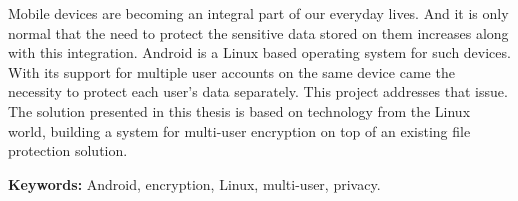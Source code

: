 
Mobile devices are becoming an integral part of our everyday lives. And it is only normal that the need to protect the sensitive data stored on them increases along with this integration. Android is a Linux based operating system for such devices. With its support for multiple user accounts on the same device came the necessity to protect each user's data separately. This project addresses that issue.
The solution presented in this thesis is based on technology from the Linux world, building a system for multi-user encryption on top of an existing file protection solution.

\textbf{Keywords:} Android, encryption, Linux, multi-user, privacy.
